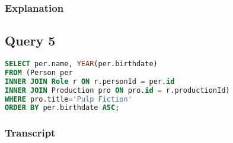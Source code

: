 \subsubsection{Explanation}


\subsection{Query 5}
\begin{lstlisting}[language=sql]
SELECT per.name, YEAR(per.birthdate)
FROM (Person per
INNER JOIN Role r ON r.personId = per.id
INNER JOIN Production pro ON pro.id = r.productionId)
WHERE pro.title='Pulp Fiction'
ORDER BY per.birthdate ASC;
\end{lstlisting}

\subsubsection{Transcript}
